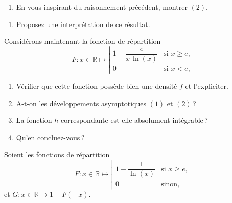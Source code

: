 
\label{I-dlfdr-mi}

\begin{enumerate}
\def\labelenumi{\arabic{enumi}.}
\setcounter{enumi}{2}
\tightlist
\item
  En vous inspirant du raisonnement précédent, montrer \((2)\).
\end{enumerate}


\label{I-dlfdr-interpret}

\begin{enumerate}
\def\labelenumi{\arabic{enumi}.}
\setcounter{enumi}{3}
\tightlist
\item
  Proposez une interprétation de ce résultat.
\end{enumerate}


\label{I-dlfdr-reciproque}
Considérons maintenant la fonction de répartition
\[ F: x \in \mathbb{R}\mapsto \left|\begin{array}{ll} 1 - \dfrac{e}{x\,\ln(x)} & \text{si } x \geq e,\\ 0 & \text{si } x <e, \end{array}\right. \]

\begin{enumerate}
\def\labelenumi{\arabic{enumi}.}
\setcounter{enumi}{4}
\item
  Vérifier que cette fonction possède bien une densité \(f\) et
  l'expliciter.
\item
  A-t-on les développements asymptotiques \((1)\) et \((2)\)\,?
\item
  La fonction \(h\) correspondante est-elle absolument intégrable\,?
\item
  Qu'en concluez-vous\,?
\end{enumerate}


\label{I-dlfdr-liensdl}
Soient les fonctions de répartition
\[F: x\in\mathbb{R}\mapsto \left|\begin{array}{ll} 1 - \dfrac{1}{\ln(x)} & \text{si } x \geq e,\\ 0 & \text{sinon,}\end{array}\right.\]
et \(G : x\in\mathbb{R}\mapsto 1 - F(-x)\).

